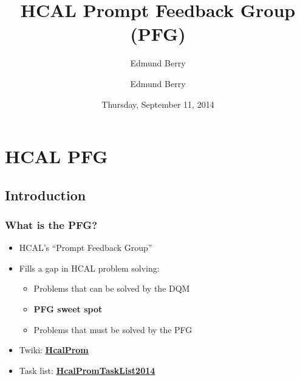 \documentclass[bigger]{beamer}
\title{HCAL Prompt Feedback Group (PFG)}
\author{Edmund Berry}
\date{Thursday, September 11, 2014}
\author[Edmund Berry]{\alert{Edmund Berry}}
\providecommand{\alert}[1]{\textbf{#1}}
\begin{document}
\maketitle


\section{HCAL PFG}
\label{sec-1}
\subsection{Introduction}
\label{sec-1-1}
\begin{frame}
\frametitle{What is the PFG?}
\label{sec-1-1-1}
\begin{itemize}

\item HCAL's ``Prompt Feedback Group''
\label{sec-1-1-1-1}%

\item Fills a gap in HCAL problem solving:
\label{sec-1-1-1-2}%
\begin{itemize}

\item Problems that can be solved by the DQM
\label{sec-1-1-1-2-1}%

\item \alert{PFG sweet spot}
\label{sec-1-1-1-2-2}%

\item Problems that must be solved by the PFG
\label{sec-1-1-1-2-3}%
\end{itemize} %

\item Twiki: \href{https://twiki.cern.ch/twiki/bin/viewauth/CMS/HcalProm}{\alert{\underline{HcalProm}}}
\label{sec-1-1-1-3}%

\item Task list: \href{https://twiki.cern.ch/twiki/bin/viewauth/CMS/HcalPromTaskList2014}{\alert{\underline{HcalPromTaskList2014}}}
\label{sec-1-1-1-4}%
\end{itemize} %
\end{frame}
\end{document}

